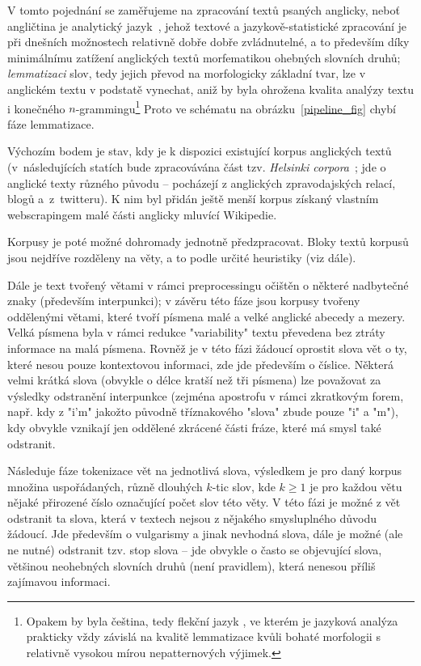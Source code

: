 V tomto pojednání se zaměřujeme na
zpracování textů psaných anglicky, neboť angličtina je
analytický
jazyk~\cite{Gorblach1991}, jehož textové a
jazykově-statistické zpracování
je při dnešních možnostech relativně dobře dobře zvládnutelné, a to
především díky minimálnímu zatížení anglických textů morfematikou%
ohebných slovních druhů; \textit{lemmatizaci} slov, tedy
jejich převod
na morfologicky základní tvar, lze v anglickém textu
v podstatě vynechat, aniž by byla ohrožena kvalita analýzy textu i konečného
$n$-grammingu\footnote{Opakem by byla čeština, tedy flekční jazyk%
, ve kterém
je jazyková analýza prakticky vždy závislá na kvalitě lemmatizace%
 kvůli bohaté
morfologii s relativně vysokou mírou nepatternových výjimek.} Proto ve
schématu na obrázku~\ref{pipeline_fig} chybí fáze lemmatizace.

Výchozím bodem je stav, kdy je k dispozici existující korpus
anglických textů
(v~následujících statích bude zpracovávána část tzv.
\textit{Helsinki corpora}~\cite{Kytoo1996};
jde o anglické texty různého
původu -- pocházejí z anglických zpravodajských relací, blogů
a~z~twitteru). K nim byl
přidán ještě menší korpus získaný vlastním webscrapingem
malé části
anglicky mluvící Wikipedie.

Korpusy je poté možné dohromady jednotně předzpracovat.
Bloky textů korpusů jsou nejdříve rozděleny na věty, a to podle určité
heuristiky (viz dále).

Dále je text tvořený větami v rámci preprocessingu očištěn
o některé nadbytečné znaky (především interpunkci);
v závěru této fáze jsou korpusy tvořeny
oddělenými větami, které tvoří písmena malé a velké anglické abecedy
a mezery. Velká písmena byla v rámci redukce "variability" textu převedena
bez ztráty informace na malá písmena. Rovněž je v této fázi žádoucí
oprostit slova vět o ty, které nesou pouze kontextovou informaci, zde jde
především o číslice. Některá velmi krátká slova (obvykle o délce kratší
než tři písmena) lze považovat za výsledky odstranění interpunkce%
 (zejména
apostrofu v rámci zkratkovým forem, např. kdy z "i'm" jakožto původně
tříznakového "slova" zbude pouze "i" a "m"), kdy obvykle vznikají jen
oddělené zkrácené části fráze, které má smysl také odstranit.

Následuje fáze tokenizace vět na jednotlivá slova,
výsledkem je pro daný korpus množina uspořádaných, různě dlouhých
$k$-tic slov, kde $k \geq 1$ je pro každou větu nějaké přirozené číslo
označující počet slov této věty. V této fázi je možné z vět odstranit ta
slova, která v textech nejsou z nějakého smysluplného důvodu žádoucí.
Jde především o vulgarismy a jinak nevhodná
slova, dále je
možné (ale ne nutné) odstranit tzv. stop slova
-- jde obvykle o často
se objevující slova, většinou neohebných slovních druhů (není pravidlem),
která nenesou příliš zajímavou informaci.

